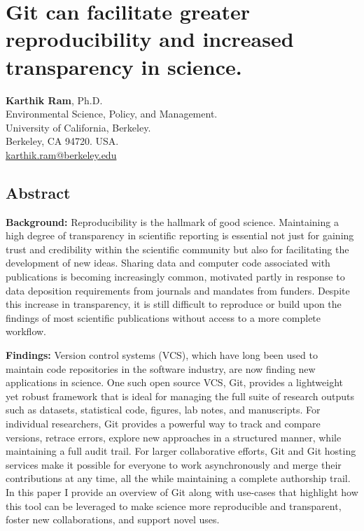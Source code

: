 \documentclass[]{article}
\author{}
\date{}
\begin{document}
\section{Git can facilitate greater reproducibility and increased
transparency in science.}

\textbf{Karthik Ram}, Ph.D.\\Environmental Science, Policy, and
Management.\\University of California, Berkeley.\\Berkeley, CA 94720.
USA.\\\href{mailto:karthik.ram@berkeley.edu}{karthik.ram@berkeley.edu}

\subsection{Abstract}

\textbf{Background:} Reproducibility is the hallmark of good science.
Maintaining a high degree of transparency in scientific reporting is
essential not just for gaining trust and credibility within the
scientific community but also for facilitating the development of new
ideas. Sharing data and computer code associated with publications is
becoming increasingly common, motivated partly in response to data
deposition requirements from journals and mandates from funders. Despite
this increase in transparency, it is still difficult to reproduce or
build upon the findings of most scientific publications without access
to a more complete workflow.

\textbf{Findings:} Version control systems (VCS), which have long been
used to maintain code repositories in the software industry, are now
finding new applications in science. One such open source VCS, Git,
provides a lightweight yet robust framework that is ideal for managing
the full suite of research outputs such as datasets, statistical code,
figures, lab notes, and manuscripts. For individual researchers, Git
provides a powerful way to track and compare versions, retrace errors,
explore new approaches in a structured manner, while maintaining a full
audit trail. For larger collaborative efforts, Git and Git hosting
services make it possible for everyone to work asynchronously and merge
their contributions at any time, all the while maintaining a complete
authorship trail. In this paper I provide an overview of Git along with
use-cases that highlight how this tool can be leveraged to make science
more reproducible and transparent, foster new collaborations, and
support novel uses.
\end{document}
